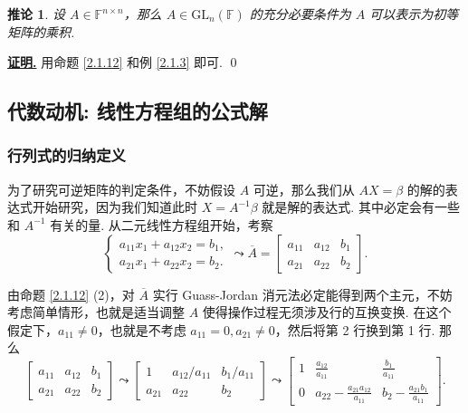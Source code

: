 \documentclass[10pt,openany]{article}
\theoremstyle{thmstyle} %
\theoremstyle{defstyle} %
\newtheorem{corollary}[theorem]{推论}
\theoremstyle{prostyle} %
\theoremstyle{exastyle}
\theoremstyle{remstyle}
\renewenvironment{proof}[1][证明]{\par\underline{\textbf{#1.}} \;\fangsong}{\qed\par}
\newcommand{\F}{\mathbb{F}}
\newcommand{\gf}{\text{GL}_n(\mathbb{F})}
\newcommand{\n}{^{n \times n}}
\begin{document}
\begin{corollary}
	设 \( A \in \F\n \)，那么 \( A \in \gf \) 的充分必要条件为 \( A \) 可以表示为初等矩阵的乘积.
	\label{2.1.13}
\end{corollary}

\begin{proof}
	用命题 \ref{2.1.12} 和例 \ref{2.1.3} 即可.
\end{proof}

\subsection{代数动机: 线性方程组的公式解}

\subsubsection{行列式的归纳定义}
为了研究可逆矩阵的判定条件，不妨假设 \( A \) 可逆，那么我们从 \( AX=\beta \) 的解的表达式开始研究，因为我们知道此时 \( X=A^{-1}\beta \) 就是解的表达式. 其中必定会有一些和 \( A^{-1} \) 有关的量. 从二元线性方程组开始，考察
\[ \left\{ \begin{array}{l}
	a_{11}x_1+a_{12}x_2=b_1, \\
	a_{21}x_1+a_{22}x_2=b_2.
\end{array}\right. \leadsto \overline{A}=\begin{bmatrix}
 a_{11} & a_{12} & b_1 \\
 a_{21} & a_{22} & b_2
\end{bmatrix}. \]

由命题 \ref{2.1.12} (2)，对 \( \overline{A} \) 实行 Guass-Jordan 消元法必定能得到两个主元，不妨考虑简单情形，也就是适当调整 \( A \) 使得操作过程无须涉及行的互换变换. 在这个假定下，\( a_{11} \neq 0 \)，也就是不考虑 \( a_{11}=0, a_{21} \neq 0 \)，然后将第 2 行换到第 1 行. 那么
\[ \begin{bmatrix}
	a_{11} & a_{12} & b_1 \\
	a_{21} & a_{22} & b_2
\end{bmatrix} \leadsto \begin{bmatrix}
1 & a_{12}/a_{11} & b_1/a_{11} \\
a_{21} & a_{22} & b_2
\end{bmatrix} \leadsto \begin{bmatrix}
1 & \frac{a_{12}}{a_{11}} & \frac{b_1}{a_{11}} \\[2ex]
0 & a_{22} - \frac{a_{21} a_{12}}{a_{11}} & b_2 - \frac{a_{21} b_1}{a_{11}}
\end{bmatrix}. \]
\end{document}
